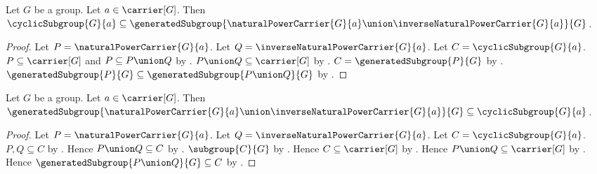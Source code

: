 \begin{proposition}\label{cyclic_subgroup_subseteq_generated_signed_natural_powers}
    Let $G$ be a group.
    Let $a\in\carrier[G]$.
    Then
        $\cyclicSubgroup{G}{a}\subseteq
            \generatedSubgroup{
                \naturalPowerCarrier{G}{a}\union
                    \inverseNaturalPowerCarrier{G}{a}}{G}$.
\end{proposition}
\begin{proof}
    Let $P=\naturalPowerCarrier{G}{a}$.
    Let $Q=\inverseNaturalPowerCarrier{G}{a}$.
    Let $C=\cyclicSubgroup{G}{a}$.
    $P\subseteq\carrier[G]$ and $P\subseteq P\union Q$ by
        .
    $P\union Q\subseteq\carrier[G]$ by
        .
    $C=\generatedSubgroup{P}{G}$ by
        .
    $\generatedSubgroup{P}{G}\subseteq
        \generatedSubgroup{P\union Q}{G}$ by
        .
\end{proof}

\begin{proposition}\label{generated_signed_natural_powers_subseteq_cyclic_subgroup}
    Let $G$ be a group.
    Let $a\in\carrier[G]$.
    Then
        $\generatedSubgroup{
            \naturalPowerCarrier{G}{a}\union
                \inverseNaturalPowerCarrier{G}{a}}{G}
            \subseteq\cyclicSubgroup{G}{a}$.
\end{proposition}
\begin{proof}
    Let $P=\naturalPowerCarrier{G}{a}$.
    Let $Q=\inverseNaturalPowerCarrier{G}{a}$.
    Let $C=\cyclicSubgroup{G}{a}$.
    $P,Q\subseteq C$ by
        .
    Hence $P\union Q\subseteq C$ by
        .
    $\subgroup{C}{G}$ by
        .
    Hence $C\subseteq\carrier[G]$ by .
    Hence $P\union Q\subseteq\carrier[G]$ by
        .
    Hence $\generatedSubgroup{P\union Q}{G}\subseteq C$ by
        .
\end{proof}

